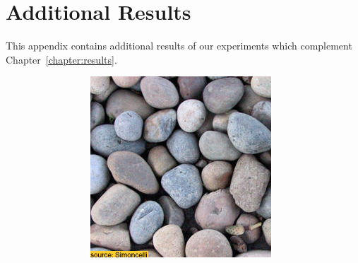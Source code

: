 \chapter{Additional Results}
\label{chapter:appendix-results}

This appendix contains additional results of our experiments which complement Chapter~\ref{chapter:results}.

\begin{figure}[]
    \centering    
    \begin{subfigure}{\textwidth}
        \centering
        \begin{subfigure}{0.24\textwidth}
            \centering
            \includegraphics[width=\textwidth]{images/04-experiment01/pebbles/target.jpg}
        \end{subfigure}
        \hfill
        \begin{subfigure}{0.24\textwidth}
            \centering

\end{subfigure}
\end{subfigure}
\end{figure}
